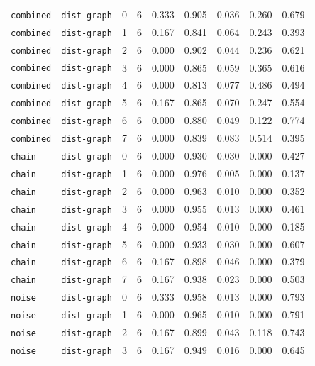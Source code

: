 \documentclass{article}
\begin{document}
\begin{center}
\begin{tabular}{lllcccccc}
\texttt{combined} & \texttt{dist-graph} & 0 & 6 & 0.333 & 0.905 & 0.036 & 0.260 & 0.679 \\
\texttt{combined} & \texttt{dist-graph} & 1 & 6 & 0.167 & 0.841 & 0.064 & 0.243 & 0.393 \\
\texttt{combined} & \texttt{dist-graph} & 2 & 6 & 0.000 & 0.902 & 0.044 & 0.236 & 0.621 \\
\texttt{combined} & \texttt{dist-graph} & 3 & 6 & 0.000 & 0.865 & 0.059 & 0.365 & 0.616 \\
\texttt{combined} & \texttt{dist-graph} & 4 & 6 & 0.000 & 0.813 & 0.077 & 0.486 & 0.494 \\
\texttt{combined} & \texttt{dist-graph} & 5 & 6 & 0.167 & 0.865 & 0.070 & 0.247 & 0.554 \\
\texttt{combined} & \texttt{dist-graph} & 6 & 6 & 0.000 & 0.880 & 0.049 & 0.122 & 0.774 \\
\texttt{combined} & \texttt{dist-graph} & 7 & 6 & 0.000 & 0.839 & 0.083 & 0.514 & 0.395 \\
\texttt{chain} & \texttt{dist-graph} & 0 & 6 & 0.000 & 0.930 & 0.030 & 0.000 & 0.427 \\
\texttt{chain} & \texttt{dist-graph} & 1 & 6 & 0.000 & 0.976 & 0.005 & 0.000 & 0.137 \\
\texttt{chain} & \texttt{dist-graph} & 2 & 6 & 0.000 & 0.963 & 0.010 & 0.000 & 0.352 \\
\texttt{chain} & \texttt{dist-graph} & 3 & 6 & 0.000 & 0.955 & 0.013 & 0.000 & 0.461 \\
\texttt{chain} & \texttt{dist-graph} & 4 & 6 & 0.000 & 0.954 & 0.010 & 0.000 & 0.185 \\
\texttt{chain} & \texttt{dist-graph} & 5 & 6 & 0.000 & 0.933 & 0.030 & 0.000 & 0.607 \\
\texttt{chain} & \texttt{dist-graph} & 6 & 6 & 0.167 & 0.898 & 0.046 & 0.000 & 0.379 \\
\texttt{chain} & \texttt{dist-graph} & 7 & 6 & 0.167 & 0.938 & 0.023 & 0.000 & 0.503 \\
\texttt{noise} & \texttt{dist-graph} & 0 & 6 & 0.333 & 0.958 & 0.013 & 0.000 & 0.793 \\
\texttt{noise} & \texttt{dist-graph} & 1 & 6 & 0.000 & 0.965 & 0.010 & 0.000 & 0.791 \\
\texttt{noise} & \texttt{dist-graph} & 2 & 6 & 0.167 & 0.899 & 0.043 & 0.118 & 0.743 \\
\texttt{noise} & \texttt{dist-graph} & 3 & 6 & 0.167 & 0.949 & 0.016 & 0.000 & 0.645 \\
\bottomrule
\end{tabular}
\end{center}
\end{document}
